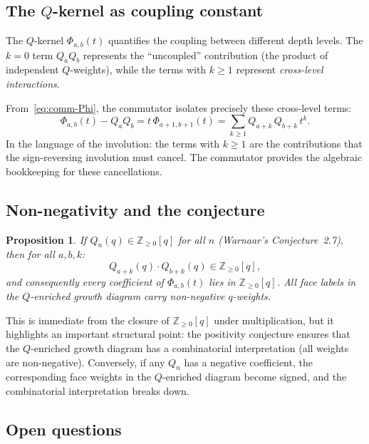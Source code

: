 \documentclass[11pt]{article}
\newcommand{\Z}{\mathbb{Z}}
\theoremstyle{plain}
\newtheorem{proposition}[theorem]{Proposition}
\theoremstyle{definition}
\begin{document}
\subsection{The $Q$-kernel as coupling constant}

The $Q$-kernel $\Phi_{a,b}(t)$ quantifies the coupling between
different depth levels.  The $k = 0$ term $Q_a Q_b$ represents
the ``uncoupled'' contribution (the product of independent
$Q$-weights), while the terms with $k \geq 1$ represent
\emph{cross-level interactions}.

From~\eqref{eq:comm-Phi}, the commutator isolates precisely these
cross-level terms:
\[
  \Phi_{a,b}(t) - Q_a Q_b
  = t\, \Phi_{a+1, b+1}(t)
  = \sum_{k \geq 1} Q_{a+k}\, Q_{b+k}\, t^k.
\]
In the language of the involution: the terms with $k \geq 1$ are
the contributions that the sign-reversing involution must cancel.
The commutator provides the algebraic bookkeeping for these
cancellations.

\subsection{Non-negativity and the conjecture}

\begin{proposition}\label{prop:Phi-nonneg}
If $Q_n(q) \in \Z_{\geq 0}[q]$ for all $n$ (Warnaar's
Conjecture~2.7), then for all $a, b, k$:
\[
  Q_{a+k}(q) \cdot Q_{b+k}(q) \in \Z_{\geq 0}[q],
\]
and consequently every coefficient of $\Phi_{a,b}(t)$ lies in
$\Z_{\geq 0}[q]$.  All face labels in the $Q$-enriched growth
diagram carry non-negative $q$-weights.
\end{proposition}

This is immediate from the closure of $\Z_{\geq 0}[q]$ under
multiplication, but it highlights an important structural point:
the positivity conjecture ensures that the $Q$-enriched growth
diagram has a combinatorial interpretation (all weights are
non-negative).  Conversely, if any $Q_n$ has a negative
coefficient, the corresponding face weights in the $Q$-enriched
diagram become signed, and the combinatorial interpretation
breaks down.

\subsection{Open questions}
\end{document}
